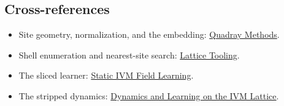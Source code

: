 \documentclass[
  10pt,
]{article}
\providecommand{\tightlist}{%
  \setlength{\itemsep}{0pt}\setlength{\parskip}{0pt}}
\begin{document}
\subsection{Cross-references}\label{cross-references}

\begin{itemize}
\tightlist
\item
  Site geometry, normalization, and the embedding:
  \href{03_quadray_methods.md}{Quadray Methods}.
\item
  Shell enumeration and nearest-site search:
  \href{13_lattice_tooling.md}{Lattice Tooling}.
\item
  The sliced learner: \href{11_ivm_field_learning.md}{Static IVM Field
  Learning}.
\item
  The stripped dynamics: \href{12_ivm_dynamics.md}{Dynamics and Learning
  on the IVM Lattice}.
\end{itemize}
\end{document}
